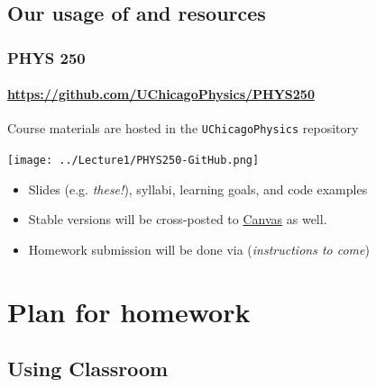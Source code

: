 \documentclass[hyperref={colorlinks=true}]{beamer}
\begin{document}
\subsection[Our usage of \git and \github resources]{Our usage of \git and \github resources}

\begin{frame}%
  \frametitle{PHYS 250 \github}
  \framesubtitle{\url{https://github.com/UChicagoPhysics/PHYS250}}
  
  Course materials are hosted in the \github \texttt{UChicagoPhysics} repository
  
  \begin{center}
    \texttt{[image: ../Lecture1/PHYS250-GitHub.png]}
  \end{center}

  \vspace{-0.5cm}

  \begin{itemize}
    \item Slides (e.g. \textit{these!}), syllabi, learning goals, and code examples
    \item Stable versions will be cross-posted to \href{\CanvasURL}{Canvas} as well.
    \item Homework submission will be done via \github (\textit{instructions to come})
  \end{itemize}
  
  
\end{frame}

\section[Plan for homework]{Plan for homework}

\subsection[Using \github Classroom]{Using \github Classroom}
\end{document}
